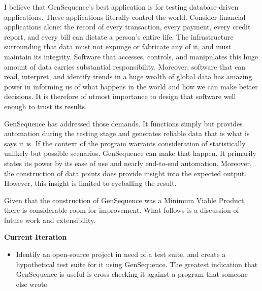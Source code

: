 
I believe that GenSequence's best application is for testing database-driven applications. These applications literally control the world. Consider financial applications alone: the record of every transaction, every payment, every credit report, and every bill can dictate a person’s entire life. The infrastructure surrounding that data must not expunge or fabricate any of it, and must maintain its integrity. Software that accesses, controls, and manipulates this huge amount of data carries substantial responsibility. Moreover, software that can read, interpret, and identify trends in a huge wealth of global data has amazing power in informing us of what happens in the world and how we can make better decisions. It is therefore of utmost importance to design that software well enough to trust its results.

GenSequence has addressed those demands. It functions simply but provides automation during the testing stage and generates reliable data that is what is says it is. If the context of the program warrants consideration of statistically unlikely but possible scenarios, GenSequence can make that happen. It primarily states its power by its ease of use and nearly end-to-end automation. Moreover, the construction of data points does provide insight into the expected output. However, this insight is limited to eyeballing the result.

Given that the construction of GenSequence was a Minimum Viable Product, there is considerable room for improvement. What follows is a discussion of future work and extensibility.

\textbf{Current Iteration}
\begin{itemize}
\item Identify an open-source project in need of a test suite, and create a hypothetical test suite for it using GenSequence. The greatest indication that GenSequence is useful is cross-checking it against a program that someone else wrote.
\end{itemize}

